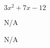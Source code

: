 \begin{answer}
    $3x^2 + 7x - 12$
\end{answer}

\begin{answer}
    N/A
\end{answer}

\begin{answer}
    N/A
\end{answer}